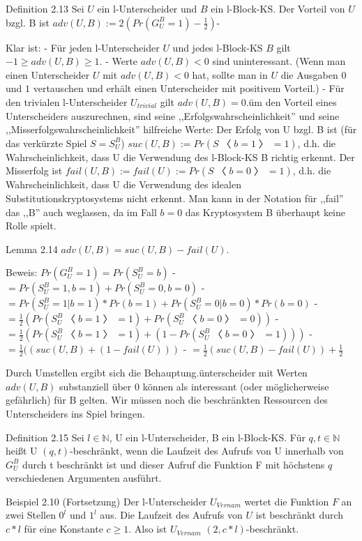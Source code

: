 \documentclass[a4paper]{article}
\begin{document}
\begin{multicols}{3}
Definition 2.13 Sei $U$ ein l-Unterscheider und $B$ ein l-Block-KS. Der Vorteil von $U$ bzgl. B ist $adv(U,B):= 2(Pr(G^B_U=1)-\frac{1}{2})$-

Klar ist:
- Für jeden l-Unterscheider $U$ und jedes l-Block-KS $B$ gilt $-1\geq adv(U,B)\geq 1$.
- Werte $adv(U,B)<0$ sind uninteressant. (Wenn man einen Unterscheider $U$ mit $adv(U,B)<0$ hat, sollte man in $U$ die Ausgaben $0$ und $1$ vertauschen und erhält einen Unterscheider mit positivem Vorteil.)
- Für den trivialen l-Unterscheider $U_{trivial}$ gilt $adv(U,B) = 0$.üm den Vorteil eines Unterscheiders auszurechnen, sind seine ,,Erfolgswahrscheinlichkeit'' und seine ,,Misserfolgswahrscheinlichkeit'' hilfreiche Werte: Der Erfolg von U bzgl. B ist (für das verkürzte Spiel $S=S_U^B$) $suc(U,B) := Pr(S〈b= 1〉= 1)$, d.h. die Wahrscheinlichkeit, dass U die Verwendung des l-Block-KS B richtig erkennt. Der Misserfolg ist $fail(U,B) := fail(U) := Pr(S〈b= 0〉= 1)$, d.h. die Wahrscheinlichkeit, dass U die Verwendung des idealen Substitutionskryptosystems nicht erkennt. Man kann in der Notation für ,,fail'' das ,,B'' auch weglassen, da im Fall $b=0$ das Kryptosystem B überhaupt keine Rolle spielt.

Lemma 2.14 $adv(U,B) = suc(U,B)-fail(U)$.

Beweis: $Pr(G^B_U= 1) = Pr(S_U^B=b)$
- $= Pr(S_U^B= 1,b= 1) + Pr(S_U^B= 0,b= 0)$
- $= Pr(S_U^B= 1|b= 1)* Pr(b= 1) + Pr(S^B_U= 0|b= 0)*Pr(b= 0)$
- $=\frac{1}{2}( Pr(S_U^B〈b= 1〉= 1) + Pr(S_U^B〈b= 0〉= 0))$
- $=\frac{1}{2}( Pr(S_U^B〈b= 1〉= 1) + (1-Pr(S_U^B〈b= 0〉= 1)))$
- $=\frac{1}{2}( (suc(U,B) + (1-fail(U)))$
- $=\frac{1}{2}(suc(U,B)-fail(U)) + \frac{1}{2}$

Durch Umstellen ergibt sich die Behauptung.ünterscheider mit Werten $adv(U,B)$ substanziell über 0 können als interessant (oder möglicherweise gefährlich) für B gelten. Wir müssen noch die beschränkten Ressourcen des Unterscheiders ins Spiel bringen.

Definition 2.15 Sei $l\in\mathbb{N}$, U ein l-Unterscheider, B ein l-Block-KS. Für $q,t\in\mathbb{N}$ heißt U $(q,t)$-beschränkt, wenn die Laufzeit des Aufrufs von U innerhalb von $G^B_U$ durch t beschränkt ist und dieser Aufruf die Funktion F mit höchstens $q$ verschiedenen Argumenten ausführt.

Beispiel 2.10 (Fortsetzung) Der l-Unterscheider $U_{Vernam}$ wertet die Funktion $F$ an zwei Stellen $0^l$ und $1^l$ aus. Die Laufzeit des Aufrufs von $U$ ist beschränkt durch $c*l$ für eine Konstante $c\geq 1$. Also ist $U_{Vernam}$ $(2,c*l)$-beschränkt.


\end{multicols}
\end{document}
